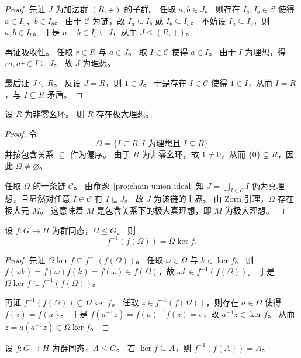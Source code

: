 \documentclass[lang=cn,a4paper,newtx]{elegantbook}
\begin{document}
\begin{proof}
先证 $J$ 为加法群 $(R,+)$ 的子群。
任取 $a,b\in J$。
则存在 $I_a,I_b\in \mathcal C$ 使得 $a\in I_a$、$b\in I_b$。
由于 $\mathcal C$ 为链，故 $I_a\subseteq I_b$ 或 $I_b\subseteq I_a$。
不妨设 $I_a\subseteq I_b$，则 $a,b\in I_b$。
于是 $a-b\in I_b\subseteq J$，从而 $J\le (R,+)$。

再证吸收性。
任取 $r\in R$ 与 $a\in J$。
取 $I\in \mathcal C$ 使得 $a\in I$。
由于 $I$ 为理想，得 $ra,ar\in I\subseteq J$。
故 $J$ 为理想。

最后证 $J\subsetneq R$。
反设 $J=R$，则 $1\in J$。
于是存在 $I\in \mathcal C$ 使得 $1\in I$，从而 $I=R$，与 $I\subsetneq R$ 矛盾。
\end{proof}

\begin{proposition}[极大理想存在性]
设 $R$ 为非零幺环。
则 $R$ 存在极大理想。
\end{proposition}

\begin{proof}
令
\[
  \Omega=\{I\subseteq R: I\text{ 为理想且 }I\subsetneq R\}
\]
并按包含关系 $\subseteq$ 作为偏序。
由于 $R$ 为非零幺环，故 $1\ne 0$，从而 $\{0\}\subsetneq R$，因此 $\Omega\ne\varnothing$。

任取 $\Omega$ 的一条链 $\mathcal C$。
由命题~\ref{pro:chain-union-ideal} 知 $J=\bigcup_{I\in \mathcal C} I$ 仍为真理想，且显然对任意 $I\in \mathcal C$ 有 $I\subseteq J$。
故 $J$ 为该链的上界。
由 Zorn 引理，$\Omega$ 存在极大元 $M$。
这意味着 $M$ 是包含关系下的极大真理想，即 $M$ 为极大理想。
\end{proof}

\begin{lemma}
设 $f:G\to H$ 为群同态，$\Omega\le G$。
则
\[
  f^{-1}(f(\Omega))=\Omega\ker f.
\]
\end{lemma}

\begin{proof}
先证 $\Omega\ker f\subseteq f^{-1}(f(\Omega))$。
任取 $\omega\in \Omega$ 与 $k\in \ker f$。
则 $f(\omega k)=f(\omega)f(k)=f(\omega)\in f(\Omega)$，故 $\omega k\in f^{-1}(f(\Omega))$。
于是 $\Omega\ker f\subseteq f^{-1}(f(\Omega))$。

再证 $f^{-1}(f(\Omega))\subseteq \Omega\ker f$。
任取 $z\in f^{-1}(f(\Omega))$，则存在 $a\in \Omega$ 使得 $f(z)=f(a)$。
于是 $f(a^{-1}z)=f(a)^{-1}f(z)=e$，故 $a^{-1}z\in \ker f$。
从而 $z=a(a^{-1}z)\in \Omega\ker f$。
\end{proof}

\begin{corollary}
设 $f:G\to H$ 为群同态，$A\le G$。
若 $\ker f\subseteq A$，则 $f^{-1}(f(A))=A$。
\end{corollary}
\end{document}
